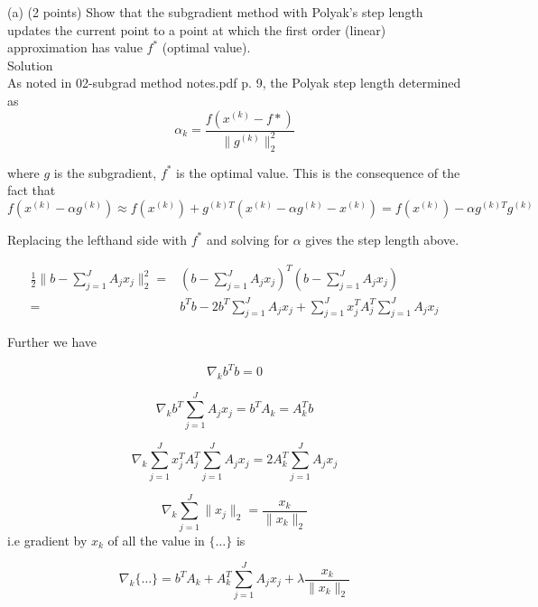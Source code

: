 \documentclass{article}
\begin{document}
(a) (2 points) Show that the subgradient method with Polyak's step length updates the current point to a point at which the first order (linear) approximation has
value $f^*$ (optimal value).\\

Solution\\

As noted in 02-subgrad \textunderscore method \textunderscore notes.pdf p. 9, the Polyak step length determined as
$$
\alpha_k = \frac{f(x^{(k)} - f*)}{\lVert g^{(k)}\rVert_2^2}
$$

where $g$ is the subgradient, $f^*$ is the optimal value.
This is the consequence of the fact that
$$
f(x^{(k)} - \alpha g^{(k)}) \approx 
f(x^{(k)}) + 
g^{(k) T} (x^{(k)} - \alpha g^{(k)} - x^{(k)}) = 
f(x^{(k)}) - \alpha g^{(k) T} g^{(k)}
$$

Replacing the lefthand side
with $f^*$ and solving for $\alpha$ gives the step length above.

\begin{align*}
\frac{1}{2} \lVert b - \sum_{j = 1}^{J} 
A_j x_j \rVert_2^2 = & 
(b - \sum_{j = 1}^{J} A_j x_j)^T (b - \sum_{j = 1}^{J} A_j x_j) \\ = &  
b^T b - 2 b^T \sum_{j = 1}^{J} A_j x_j + \sum_{j = 1}^{J} x_j^T A_j^T \sum_{j = 1}^{J} A_j x_j
\end{align*}

Further we have

$$
\nabla_k b^Tb = 0
$$

$$
\nabla_k b^T \sum_{j = 1}^{J} A_j x_j = 
b^T A_k = A_k^T b
$$

$$
\nabla_k \sum_{j = 1}^{J} x_j^T A_j^T \sum_{j = 1}^{J} A_j x_j 
= 2 A_k^T \sum_{j = 1}^{J} A_j x_j 
$$

$$
\nabla_k  \sum_{j = 1}^{J} \lVert x_j \rVert_2 = \frac{x_k} {\lVert x_k \rVert_2}
$$
i.e gradient by $x_k$ of all the value in 
$\bigg \{ \dots \bigg \}$ is

$$
\nabla_k \bigg \{ \dots \bigg \} = b^T A_k + 
A_k^T \sum_{j = 1}^{J} A_j x_j  + 
\lambda \frac{x_k} {\lVert x_k \rVert_2}
$$
\end{document}
